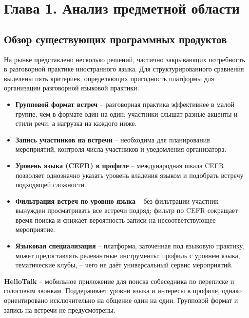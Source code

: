 \section*{Глава 1. Анализ предметной области}

\subsection{Обзор существующих программных продуктов}

На рынке представлено несколько решений, частично закрывающих потребность
в разговорной практике иностранного языка. Для структурированного сравнения
выделены пять критериев, определяющих пригодность платформы для организации
разговорной языковой практики:

\begin{itemize}
    \item \textbf{Групповой формат встреч} -- разговорная практика эффективнее
          в малой группе, чем в формате один на один: участники слышат разные
          акценты и стили речи, а нагрузка на каждого ниже.
    \item \textbf{Запись участников на встречи} -- необходима для планирования
          мероприятий, контроля числа участников и уведомления организатора.
    \item \textbf{Уровень языка (CEFR) в профиле} -- международная шкала CEFR
          позволяет однозначно указать уровень владения языком и подобрать
          встречу подходящей сложности.
    \item \textbf{Фильтрация встреч по уровню языка} -- без фильтрации участник
          вынужден просматривать все встречи подряд; фильтр по CEFR сокращает
          время поиска и снижает вероятность записи на несоответствующее мероприятие.
    \item \textbf{Языковая специализация} -- платформа, заточенная под языковую
          практику, может предоставлять релевантные инструменты: профиль с уровнем
          языка, тематические клубы, -- чего не даёт универсальный сервис мероприятий.
\end{itemize}

\textbf{HelloTalk} -- мобильное приложение для поиска собеседника по переписке
и голосовым звонкам. Поддерживает уровни языка и интересы в профиле, однако
ориентировано исключительно на общение один на один. Групповой формат и запись
на встречи не предусмотрены.

